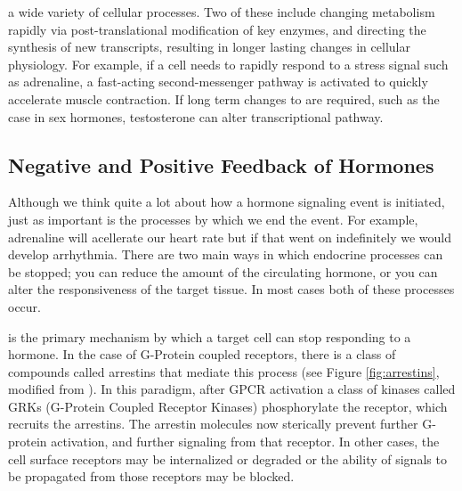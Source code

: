 \documentclass{tufte-handout}
\begin{document}
 a wide variety of cellular processes.  Two of these include changing metabolism rapidly via post-translational modification of key enzymes, and directing the synthesis of new transcripts, resulting in longer lasting changes in cellular physiology.  For example, if a cell needs to rapidly respond to a stress signal such as adrenaline, a fast-acting second-messenger pathway is activated to quickly accelerate muscle contraction.  If long term changes to  are required, such as the case in sex hormones, testosterone can alter transcriptional pathway.


\subsection{Negative and Positive Feedback of Hormones}

Although we think quite a lot about how a hormone signaling event is initiated, just as important is the processes by which we end the event.  For example, adrenaline will acellerate our heart rate but if that went on indefinitely we would develop arrhythmia.  There are two main ways in which endocrine processes can be stopped;  you can reduce the amount of the circulating hormone, or you can alter the responsiveness of the target tissue.  In most cases both of these processes occur.

 is the primary mechanism by which a target cell can stop responding to a hormone.  In the case of G-Protein coupled receptors, there is a class of compounds called arrestins that mediate this process (see Figure \ref{fig:arrestins}, modified from \cite{Lefkowitz2005}).  In this paradigm, after GPCR activation a class of kinases called GRKs (G-Protein Coupled Receptor Kinases) phosphorylate the receptor, which recruits the arrestins.  The arrestin molecules now sterically prevent further G-protein activation, and further signaling from that receptor.  In other cases, the cell surface receptors may be internalized or degraded or the ability of signals to be propagated from those receptors may be blocked.
\end{document}
